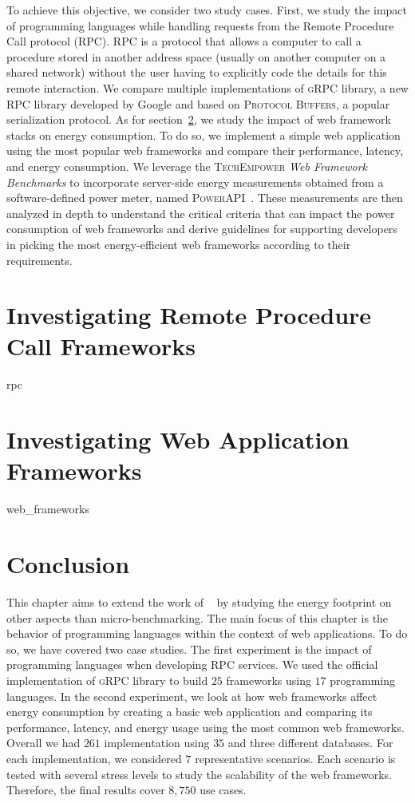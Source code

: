 To achieve this objective, we consider two study cases.
First, we study the impact of programming languages while handling requests from the Remote Procedure Call protocol (RPC).
RPC is a protocol that allows a computer to call a procedure stored in another address space (usually on another computer on a shared network) without the user having to explicitly code the details for this remote interaction.
We compare multiple implementations of \textsc{gRPC} library, a new RPC library developed by Google and based on \textsc{Protocol Buffers}, a popular serialization protocol.
As for section~\ref{sec:webframework}, we study the impact of web framework stacks on energy consumption. To do so, we implement a simple web application using the most popular web frameworks and compare their performance, latency, and energy consumption.  We leverage the \textsc{TechEmpower} \emph{Web Framework Benchmarks} to incorporate server-side energy measurements obtained from a software-defined power meter, named \textsc{PowerAPI}~\cite{fieni2020smartwatts}.
These measurements are then analyzed in depth to understand the critical criteria that can impact the power consumption of web frameworks and derive guidelines for supporting developers in picking the most energy-efficient web frameworks according to their requirements.


\section{Investigating Remote Procedure Call Frameworks}
{rpc}

\section{Investigating Web Application Frameworks}\label{sec:webframework}

{web_frameworks}

\section{Conclusion}
This chapter aims to extend the work of \citeauthor{pereira_energy_2017}~\cite{pereira_energy_2017} by studying the energy footprint on other aspects than micro-benchmarking.
The main focus of this chapter is the behavior of programming languages within the context of web applications.
To do so, we have covered two case studies.
The first experiment is the impact of programming languages when developing RPC services.
We used the official implementation of \textsc{gRPC} library to build $25$ frameworks using $17$ programming languages.
In the second experiment, we look at how web frameworks affect energy consumption by creating a basic web application and comparing its performance, latency, and energy usage using the most common web frameworks.
Overall we had $261$ implementation using $35$ and three different databases.
For each implementation, we considered $7$ representative scenarios.
Each scenario is tested with several stress levels to study the scalability of the web frameworks.
Therefore, the final results cover $8,750$ use cases.

